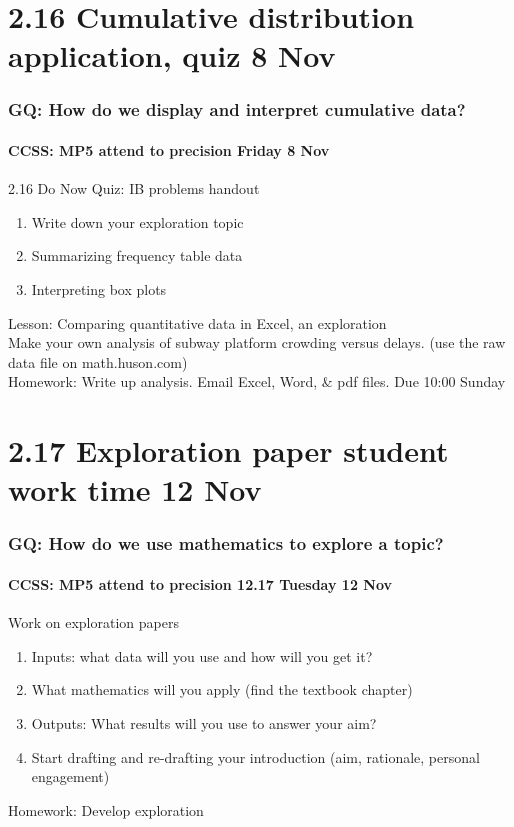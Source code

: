 \documentclass{beamer}
\begin{document}
\section{2.16 Cumulative distribution application, quiz 8 Nov}
\frame
{
  \frametitle{GQ: How do we display and interpret cumulative data?}
  \framesubtitle{CCSS: MP5 attend to precision \hfill \alert{Friday 8 Nov}}

  \begin{block}{2.16 Do Now Quiz: IB problems handout}
  \begin{enumerate}
      \item Write down your exploration topic 
      \item Summarizing frequency table data
      \item Interpreting box plots
  \end{enumerate}
  \end{block}
  Lesson: Comparing quantitative data in Excel, an exploration\\
  Make your own analysis of subway platform crowding versus delays. (use the raw data file on math.huson.com) \\ \smallskip
  Homework: Write up analysis. Email Excel, Word, \& pdf files. Due 10:00 Sunday
}


\section{2.17 Exploration paper student work time 12 Nov}
\frame
{
  \frametitle{GQ: How do we use mathematics to explore a topic?}
  \framesubtitle{CCSS: MP5 attend to precision \hfill \alert{12.17 Tuesday 12 Nov}}

  \begin{block}{Work on exploration papers}
  \begin{enumerate}
      \item Inputs: what data will you use and how will you get it? 
      \item What mathematics will you apply (find the textbook chapter)
      \item Outputs: What results will you use to answer your aim?
      \item Start drafting and re-drafting your introduction (aim, rationale, personal engagement)
  \end{enumerate}
  \end{block}
  Homework: Develop exploration 
}
\end{document}

